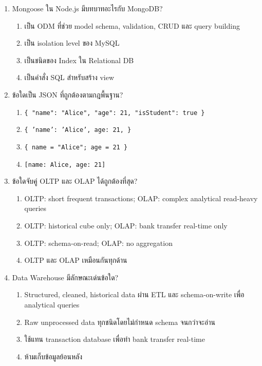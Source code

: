 \documentclass[a4paper,12pt]{article}
\begin{document}
\begin{enumerate}[label=\textbf{\arabic*.}]
    \item Mongoose ใน Node.js มีบทบาทอะไรกับ MongoDB?
    \begin{enumerate}[label=\alph*.]
        \item เป็น ODM ที่ช่วย model schema, validation, CRUD และ query building
        \item เป็น isolation level ของ MySQL
        \item เป็นชนิดของ Index ใน Relational DB
        \item เป็นคำสั่ง SQL สำหรับสร้าง view
    \end{enumerate}

    \item ข้อใดเป็น JSON ที่ถูกต้องตามกฎพื้นฐาน?
    \begin{enumerate}[label=\alph*.]
        \item \texttt{\{ "name": "Alice", "age": 21, "isStudent": true \}}
        \item \texttt{\{ 'name': 'Alice', age: 21, \}}
        \item \texttt{\{ name = "Alice"; age = 21 \}}
        \item \texttt{[name: Alice, age: 21]}
    \end{enumerate}

    \item ข้อใดจับคู่ OLTP และ OLAP ได้ถูกต้องที่สุด?
    \begin{enumerate}[label=\alph*.]
        \item OLTP: short frequent transactions; OLAP: complex analytical read-heavy queries
        \item OLTP: historical cube only; OLAP: bank transfer real-time only
        \item OLTP: schema-on-read; OLAP: no aggregation
        \item OLTP และ OLAP เหมือนกันทุกด้าน
    \end{enumerate}

    \item Data Warehouse มีลักษณะเด่นข้อใด?
    \begin{enumerate}[label=\alph*.]
        \item Structured, cleaned, historical data ผ่าน ETL และ schema-on-write เพื่อ analytical queries
        \item Raw unprocessed data ทุกชนิดโดยไม่กำหนด schema จนกว่าจะอ่าน
        \item ใช้แทน transaction database เพื่อทำ bank transfer real-time
        \item ห้ามเก็บข้อมูลย้อนหลัง
    \end{enumerate}


\end{enumerate}
\end{document}
